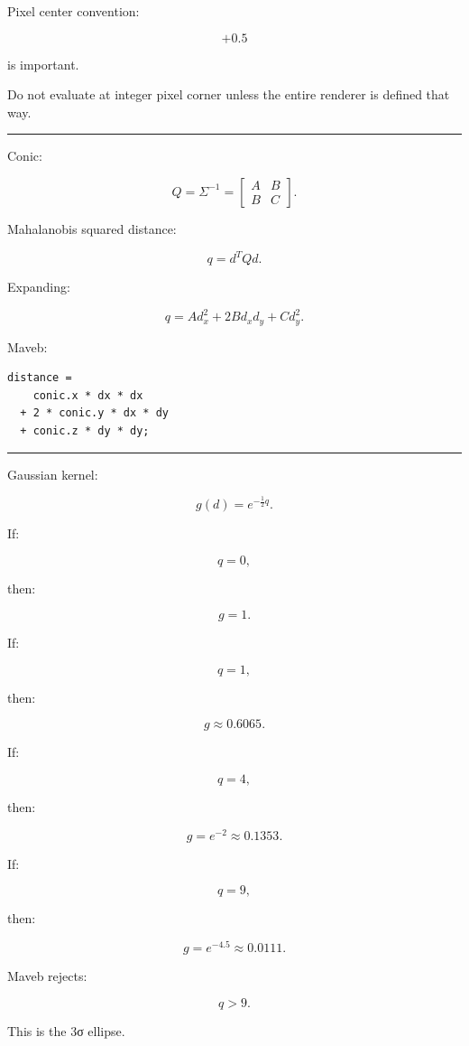 Pixel center convention:

\[
+0.5
\]

is important.

Do not evaluate at integer pixel corner unless the entire renderer is defined that way.

\begin{center}\rule{0.5\linewidth}{0.5pt}\end{center}

Conic:

\[
Q=
\Sigma^{-1}
=
\begin{bmatrix}
A&B\\
B&C
\end{bmatrix}.
\]

Mahalanobis squared distance:

\[
\boxed{
q=
d^TQd.
}
\]

Expanding:

\[
\boxed{
q=
Ad_x^2
+
2Bd_xd_y
+
Cd_y^2.
}
\]

Maveb:

\begin{verbatim}
distance =
    conic.x * dx * dx
  + 2 * conic.y * dx * dy
  + conic.z * dy * dy;
\end{verbatim}

\begin{center}\rule{0.5\linewidth}{0.5pt}\end{center}

Gaussian kernel:

\[
\boxed{
g(d)
=
e^{-\frac12q}.
}
\]

If:

\[
q=0,
\]

then:

\[
g=1.
\]

If:

\[
q=1,
\]

then:

\[
g\approx0.6065.
\]

If:

\[
q=4,
\]

then:

\[
g=e^{-2}\approx0.1353.
\]

If:

\[
q=9,
\]

then:

\[
g=e^{-4.5}\approx0.0111.
\]

Maveb rejects:

\[
q>9.
\]

This is the 3σ ellipse.

